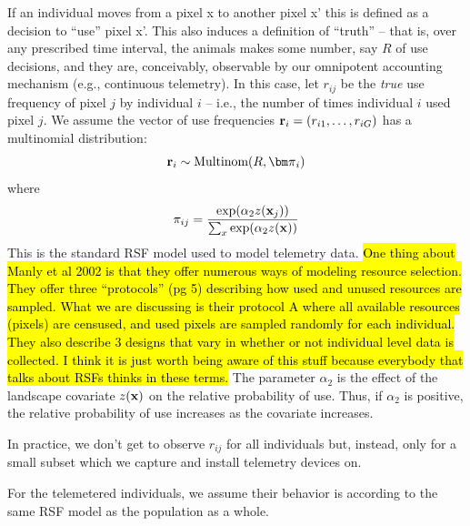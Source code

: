 If an individual moves from a pixel x to another pixel x' this is
defined as a decision to ``use'' pixel x'. This also induces a
definition of ``truth'' -- that is, over any prescribed time
interval, the animals makes some number, say $R$ of use decisions, and
they are, conceivably, observable by our omnipotent accounting
mechanism (e.g., continuous telemetry).
In this case, 
let $r_{ij}$ be the {\it true} use frequency of pixel $j$ by individual $i$ --
i.e.,
the number of times individual $i$ used pixel $j$.
We assume the 
vector of use frequencies ${\bf r}_{i} = (r_{i1},\ldots,r_{iG})$ has a
multinomial distribution:
\[
{\bf r}_{i} \sim \mbox{Multinom}(R, {\bm \pi}_{i})
\]
where
\[
 \pi_{ij} = \frac{ \exp( \alpha_{2} z({\bf x}_{j}) ) }{ \sum_{x}
   \exp(\alpha_{2} z({\bf x}))}
\]
This is the standard RSF model \citep{manly_etal:2002} used to model
telemetry data.
\hl{One thing about Manly et al 2002 is that they offer
  numerous ways of modeling resource selection. They offer three
  ``protocols'' (pg 5) describing how used and unused resources are
  sampled. What we are discussing is their protocol A where all
  available resources (pixels) are censused, and used pixels are
  sampled randomly for each individual. They also describe 3 designs
  that vary in whether or not individual level data is collected. I
  think it is just worth being aware of this stuff because everybody
  that talks about RSFs thinks in these terms.}
The parameter $\alpha_2$ is the effect of the
landscape covariate $z({\bf x})$ on the relative probability of
use. Thus, if $\alpha_2$ is positive, the relative probability of use
increases as the covariate increases.

In practice, we don't get to
observe $r_{ij}$ for all individuals but, instead, only for a small
subset which we capture and install telemetry devices on.

For the telemetered individuals, we assume their behavior is according
to the same RSF model as the population as a whole.



